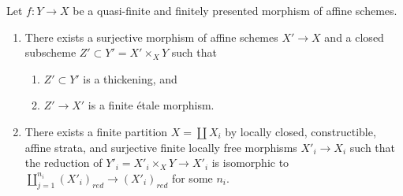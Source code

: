 \begin{lemma}
\label{lemma-decompose-quasi-finite-morphism}
Let $f : Y \to X$ be a quasi-finite and finitely presented
morphism of affine schemes.
\begin{enumerate}
\item There exists a surjective morphism of affine schemes $X' \to X$ and a
closed subscheme $Z' \subset Y' = X' \times_X Y$ such that
\begin{enumerate}
\item $Z' \subset Y'$ is a thickening, and
\item $Z' \to X'$ is a finite \'etale morphism.
\end{enumerate}
\item There exists a finite partition $X = \coprod X_i$ by
locally closed, constructible, affine strata, and surjective finite locally
free morphisms $X'_i \to X_i$ such that the reduction of
$Y'_i = X'_i \times_X Y \to X'_i$ is isomorphic to
$\coprod_{j = 1}^{n_i} (X'_i)_{red} \to (X'_i)_{red}$ for some $n_i$.
\end{enumerate}
\end{lemma}

